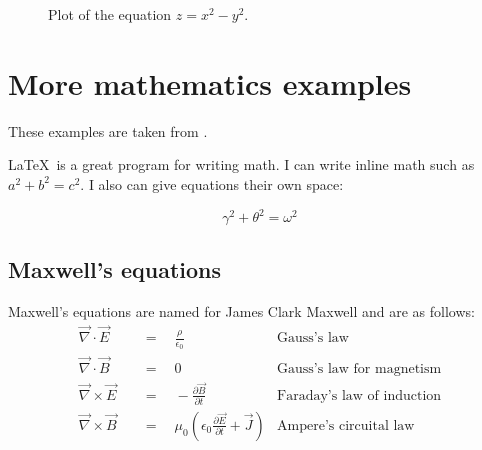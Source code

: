 \begin{figure}[htbp!]
    \centering
    \caption{Plot of the equation \( z = x^2 - y^2 \).}
    \label{fig:saddle}
\end{figure}

\section{More mathematics examples}
These examples are taken from \autocite{fre2021}.

\LaTeX\ is a great program for writing math. I can write inline
math such as \( a^2 + b^2 = c^2 \). I also can give equations
their own space:

\begin{equation}
    \gamma^2 + \theta^2 = \omega^2
\end{equation}

\subsection{Maxwell's equations}
Maxwell's equations are named for James Clark Maxwell and are as follows:
\nopagebreak
\begin{align}
    \vec{\nabla} \cdot \vec{E} \quad  & = \quad \frac{\rho}{\epsilon_0} & \text{Gauss's law} \\
    \vec{\nabla} \cdot \vec{B} \quad  & = \quad 0 & \text{Gauss's law for magnetism} \\
    \vec{\nabla} \times \vec{E} \quad & = \quad - \frac{\partial\vec{B}}{\partial t} & \text{Faraday's law of induction} \\
    \vec{\nabla} \times \vec{B} \quad & = \quad \mu_0 \left(\epsilon_0\frac{\partial\vec{E}}{\partial t} + \vec{J}\right) & \text{Ampere's circuital law}
\end{align}

